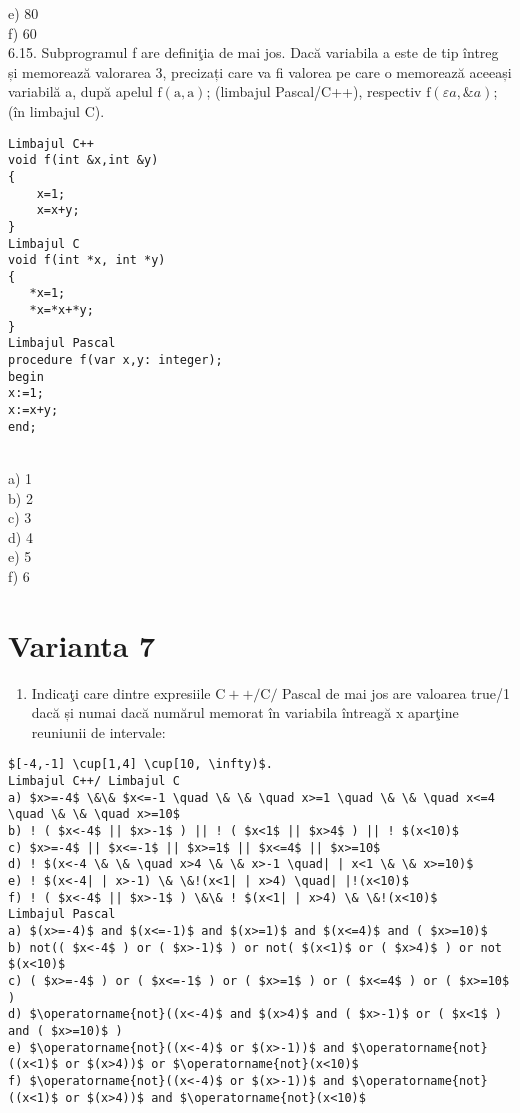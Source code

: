 e) 80
\\
f) 60
\\
6.15. Subprogramul f are definiţia de mai jos. Dacă variabila a este de tip întreg și memorează valorarea 3, precizați care va fi valorea pe care o memorează aceeași variabilă a, după apelul $\mathrm{f}(\mathrm{a}, \mathrm{a})$; (limbajul Pascal/C++), respectiv $\mathrm{f}(\varepsilon a, \& a)$; (în limbajul C).
\begin{verbatim}
Limbajul C++
void f(int &x,int &y)
{
    x=1;
    x=x+y;
}
Limbajul C
void f(int *x, int *y) 
{ 
   *x=1; 
   *x=*x+*y; 
} 
Limbajul Pascal
procedure f(var x,y: integer);
begin
x:=1;
x:=x+y;
end;
\end{verbatim}
\\
a) 1
\\
b) 2
\\
c) 3
\\
d) 4
\\
e) 5
\\
f) 6
\\

\section*{Varianta 7}

\begin{enumerate}
  \item Indicaţi care dintre expresiile $\mathrm{C}++/ \mathrm{C} /$ Pascal de mai jos are valoarea true/1 dacă și numai dacă numărul memorat în variabila întreagă x aparţine reuniunii de intervale:
\end{enumerate}

\begin{verbatim}
$[-4,-1] \cup[1,4] \cup[10, \infty)$.
Limbajul C++/ Limbajul C
a) $x>=-4$ \&\& $x<=-1 \quad \& \& \quad x>=1 \quad \& \& \quad x<=4 \quad \& \& \quad x>=10$
b) ! ( $x<-4$ || $x>-1$ ) || ! ( $x<1$ || $x>4$ ) || ! $(x<10)$
c) $x>=-4$ || $x<=-1$ || $x>=1$ || $x<=4$ || $x>=10$
d) ! $(x<-4 \& \& \quad x>4 \& \& x>-1 \quad| | x<1 \& \& x>=10)$
e) ! $(x<-4| | x>-1) \& \&!(x<1| | x>4) \quad| |!(x<10)$
f) ! ( $x<-4$ || $x>-1$ ) \&\& ! $(x<1| | x>4) \& \&!(x<10)$
Limbajul Pascal
a) $(x>=-4)$ and $(x<=-1)$ and $(x>=1)$ and $(x<=4)$ and ( $x>=10)$
b) not(( $x<-4$ ) or ( $x>-1)$ ) or not( $(x<1)$ or ( $x>4)$ ) or not $(x<10)$
c) ( $x>=-4$ ) or ( $x<=-1$ ) or ( $x>=1$ ) or ( $x<=4$ ) or ( $x>=10$ )
d) $\operatorname{not}((x<-4)$ and $(x>4)$ and ( $x>-1)$ or ( $x<1$ ) and ( $x>=10)$ )
e) $\operatorname{not}((x<-4)$ or $(x>-1))$ and $\operatorname{not}((x<1)$ or $(x>4))$ or $\operatorname{not}(x<10)$
f) $\operatorname{not}((x<-4)$ or $(x>-1))$ and $\operatorname{not}((x<1)$ or $(x>4))$ and $\operatorname{not}(x<10)$
\end{verbatim}

